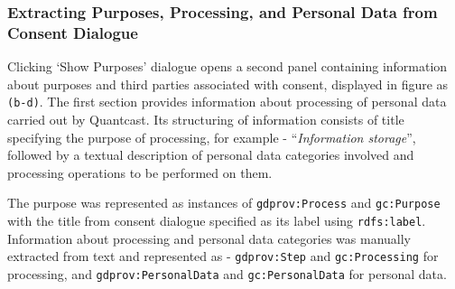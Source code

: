 \subsubsection{Extracting Purposes, Processing, and Personal Data from Consent Dialogue}
Clicking `Show Purposes' dialogue opens a second panel containing information about purposes and third parties associated with consent, displayed in figure as \texttt{(b-d)}.
The first section provides information about processing of personal data carried out by Quantcast. Its structuring of information consists of title specifying the purpose of processing, for example - ``\textit{Information storage}'', followed by a textual description of personal data categories involved and processing operations to be performed on them.

The purpose was represented as instances of \texttt{gdprov:Process} and \texttt{gc:Purpose} with the title from consent dialogue specified as its label using \texttt{rdfs:label}. 
Information about processing and personal data categories was manually extracted from text and represented as - \texttt{gdprov:Step} and \texttt{gc:Processing} for processing, and \texttt{gdprov:PersonalData} and \texttt{gc:PersonalData} for personal data.

